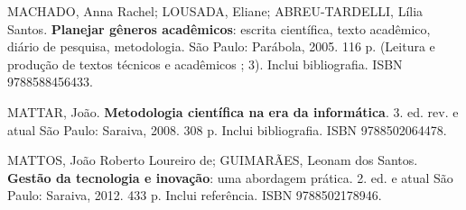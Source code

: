 \begin{pud}
\begin{bibcomplementar}
			\item MACHADO, Anna Rachel; LOUSADA, Eliane; ABREU-TARDELLI, Lília Santos.  {\bfseries Planejar gêneros acadêmicos}: escrita científica, texto acadêmico, diário de pesquisa, metodologia. São Paulo: Parábola, 2005. 116 p. (Leitura e produção de textos técnicos e acadêmicos ; 3). Inclui bibliografia. ISBN 9788588456433. %
			\item MATTAR, João.  {\bfseries Metodologia científica na era da informática}. 3. ed. rev. e atual São Paulo: Saraiva, 2008. 308 p. Inclui bibliografia. ISBN 9788502064478.
			\item MATTOS, João Roberto Loureiro de; GUIMARÃES, Leonam dos Santos.  {\bfseries Gestão da tecnologia e inovação}: uma abordagem prática. 2. ed. e atual São Paulo: Saraiva, 2012. 433 p. Inclui referência. ISBN 9788502178946. %
			
	\end{bibcomplementar}
		
	
\end{pud}



